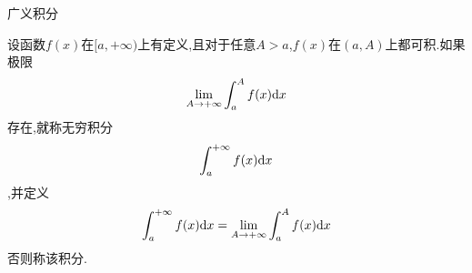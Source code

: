 \documentclass{ctexart}
\begin{document}
\pagestyle{empty}
\begin{center}\large 广义积分\end{center}
\begin{definition}[1.1 无穷积分]
    设函数$f(x)$在$[a,+\infty)$上有定义,且对于任意$A>a$,$f(x)$在$(a,A)$上都可积.如果极限
    \[\lim_{A\to+\infty}\int_a^Af(x)\mathrm{d} x\]
    存在,就称无穷积分
    \[\int_a^{+\infty}f(x)\mathrm{d} x\]
    ,并定义
    \[\int_a^{+\infty}f(x)\mathrm{d} x=\lim_{A\to+\infty}\int_a^Af(x)\mathrm{d} x\]
    否则称该积分.
\end{definition}
\end{document}
